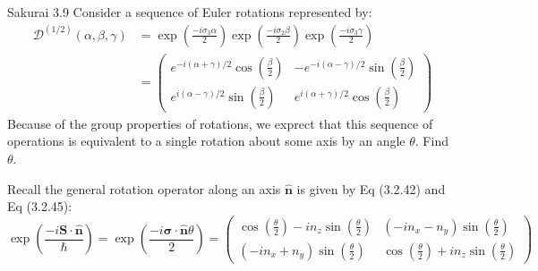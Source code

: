 \documentclass{article}
\newcommand{\bs}{\boldsymbol}
\begin{document}
\newpage
\begin{section}{Sakurai 3.9}
Consider a sequence of Euler rotations represented by:
\begin{align*}
	\mathcal{D}^{(1/2)}(\alpha, \beta, \gamma) & = \exp \left(\frac{-i \sigma_3 \alpha}{2}\right) \exp \left(\frac{-i \sigma_2 \beta}{2}\right) \exp \left( \frac{-i \sigma_3 \gamma}{2} \right) \\
	                                           & = \begin{pmatrix}
		                                               e^{-i(\alpha + \gamma)/2} \cos \left( \frac{\beta}{2} \right) & -e^{-i(\alpha - \gamma)/2} \sin \left( \frac{\beta}{2} \right) \\
		                                               e^{i(\alpha - \gamma)/2} \sin \left( \frac{\beta}{2} \right)  & e^{i(\alpha + \gamma)/2} \cos \left( \frac{\beta}{2} \right)
	                                               \end{pmatrix}
\end{align*}
Because of the group properties of rotations, we exprect that this sequence of operations is equivalent to a single rotation about some axis by an angle $\theta$. Find $\theta$.

\begin{tcolorbox}
	Recall the general rotation operator along an axis $\bs{\hat{n}}$ is given by Eq (3.2.42) and Eq (3.2.45):
	$$
		\exp \left( \frac{-i \bs{S} \cdot \bs{\hat{n}}}{\hbar} \right) = \exp \left( \frac{-i \bs{\sigma} \cdot \bs{\hat{n}} \theta}{2} \right) = \begin{pmatrix}
			\cos \left( \frac{\theta}{2} \right) - i n_z \sin \left( \frac{\theta}{2} \right)
			 & (-i n_x - n_y) \sin \left( \frac{\theta}{2} \right)                               \\
			(-i n_x + n_y) \sin \left( \frac{\theta}{2} \right)
			 & \cos \left( \frac{\theta}{2} \right) + i n_z \sin \left( \frac{\theta}{2} \right)
		\end{pmatrix}
	$$


\end{tcolorbox}
\end{section}
\end{document}
